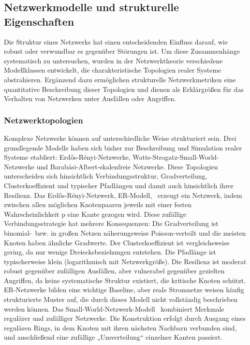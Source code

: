 \documentclass[14pt,a4paper]{scrartcl}
\begin{document}
\subsection{Netzwerkmodelle und strukturelle Eigenschaften}
Die Struktur eines Netzwerks hat einen entscheidenden Einfluss darauf, wie robust oder verwundbar es gegenüber Störungen ist. Um diese Zusammenhänge systematisch zu untersuchen, wurden in der Netzwerktheorie verschiedene Modellklassen entwickelt, die charakteristische Topologien realer Systeme abstrahieren. Ergänzend dazu ermöglichen strukturelle Netzwerkmetriken eine quantitative Beschreibung dieser Topologien und dienen als Erklärgrößen für das Verhalten von Netzwerken unter Ausfällen oder Angriffen.
\subsubsection{Netzwerktopologien}
Komplexe Netzwerke können auf unterschiedliche Weise strukturiert sein. Drei grundlegende Modelle haben sich bisher zur Beschreibung und Simulation realer Systeme etabliert: Erdős-Rényi-Netzwerke, Watts-Strogatz-Small-World-Netzwerke und Barabási-Albert-skalenfreie Netzwerke. Diese Topologien unterscheiden sich hinsichtlich Verbindungsstruktur, Gradverteilung, Clusterkoeffizient und typischer Pfadlängen und damit auch hinsichtlich ihrer Resilienz.
Das Erdős-Rényi-Netzwerk, ER-Modell,~\cite{Erdos1959RandomGraphs} erzeugt ein Netzwerk, indem zwischen allen möglichen Knotenpaaren jeweils mit einer festen Wahrscheinlichkeit p eine Kante gezogen wird. Diese zufällige Verbindungsstrategie hat mehrere Konsequenzen:
  Die Gradverteilung ist binomial-\ bzw. in großen Netzen näherungsweise Poisson-verteilt und die meisten Knoten haben ähnliche Gradwerte.
	Der Clusterkoeffizient ist vergleichsweise gering, da nur wenige Dreiecksbeziehungen entstehen.
	Die Pfadlänge ist typischerweise klein (logarithmisch mit Netzwerkgröße).
	Die Resilienz ist moderat robust gegenüber zufälligen Ausfällen, aber vulnerabel gegenüber gezielten Angriffen, da keine systematische Struktur existiert, die kritische Knoten schützt.
ER-Netzwerke bilden eine wichtige Baseline, aber reale Stromnetze weisen häufig strukturierte Muster auf, die durch dieses Modell nicht vollständig beschrieben werden können.
Das Small-World-Netzwerk-Modell~\cite{Watts1998SmallWorld} kombiniert Merkmale regulärer und zufälliger Netzwerke. Die Konstruktion erfolgt durch Ausgang eines regulären Rings, in dem Knoten mit ihren nächsten Nachbarn verbunden sind, und anschließend eine zufällige „Umverteilung“ einzelner Kanten passiert.
\end{document}
